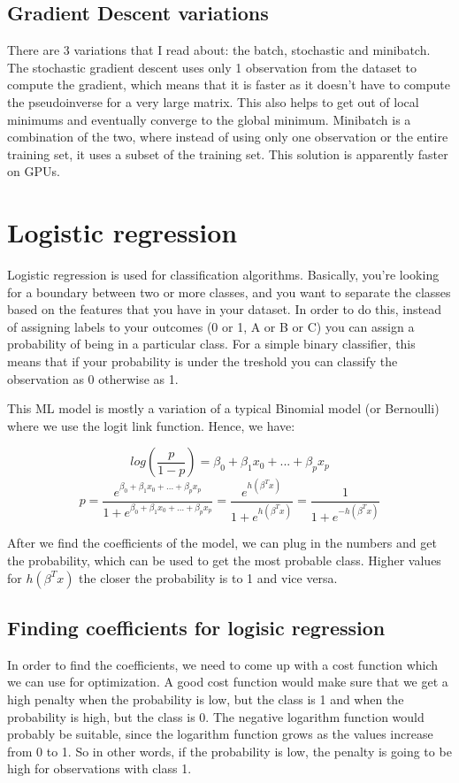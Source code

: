 \documentclass[12pt,a4paper]{article}
\begin{document}
\subsection{Gradient Descent variations} 
There are 3 variations that I read about: the batch, stochastic and minibatch. The stochastic gradient descent uses only 1 observation from the dataset to compute the gradient, which means that it is faster as it doesn't have to compute the pseudoinverse for a very large matrix. This also helps to get out of local minimums and eventually converge to the global minimum. Minibatch is a combination of the two, where instead of using only one observation or the entire training set, it uses a subset of the training set. This solution is apparently faster on GPUs.


\section{Logistic regression}

Logistic regression is used for classification algorithms. Basically, you're looking for a boundary between two or more classes, and you want to separate the classes based on the features that you have in your dataset. In order to do this, instead of assigning labels to your outcomes (0 or 1, A or B or C) you can assign a probability of being in a particular class. For a simple binary classifier, this means that if your probability is under the treshold you can classify the observation as 0 otherwise as 1.

This ML model is mostly a variation of a typical Binomial model (or Bernoulli) where we use the logit link function. Hence, we have:

$$log(\frac{p}{1 - p}) = \beta_{0} + \beta_{1}x_{0} + ... + \beta_{p}x_{p}$$
$$p = \frac{e^{\beta_{0} + \beta_{1}x_{0} + ... + \beta_{p}x_{p}}}{1 + e^{\beta_{0} + \beta_{1}x_{0} + ... + \beta_{p}x_{p}}} = \frac{e^{h(\beta^{T}x)}}{1 + e^{h(\beta^{T}x)}} = \frac{1}{1 + e^{-h(\beta^{T}x)}}$$

After we find the coefficients of the model, we can plug in the numbers and get the probability, which can be used to get the most probable class. Higher values for $h(\beta^{T}x)$ the closer the probability is to 1 and vice versa.

\subsection{Finding coefficients for logisic regression}
In order to find the coefficients, we need to come up with a cost function which we can use for optimization. A good cost function would make sure that we get a high penalty when the probability is low, but the class is 1 and when the probability is high, but the class is 0. The negative logarithm function would probably be suitable, since the logarithm function grows as the values increase from 0 to 1. So in other words, if the probability is low, the penalty is going to be high for observations with class 1.
\end{document}
